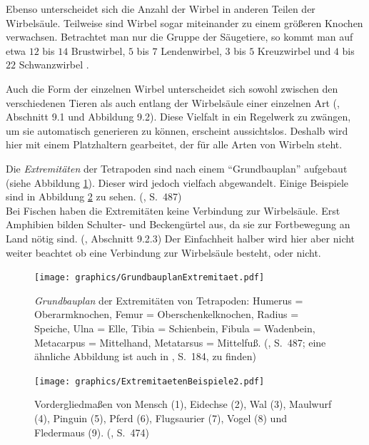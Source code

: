 Ebenso unterscheidet sich die Anzahl der Wirbel in anderen Teilen der Wirbelsäule. Teilweise sind Wirbel sogar miteinander zu einem größeren Knochen verwachsen. Betrachtet man nur die Gruppe der Säugetiere, so kommt man auf etwa $12$ bis $14$ Brustwirbel, $5$ bis $7$ Lendenwirbel, $3$ bis $5$ Kreuzwirbel und $4$ bis $22$ Schwanzwirbel \cite{AnatomieKuenstler}.

Auch die Form der einzelnen Wirbel unterscheidet sich sowohl zwischen den verschiedenen Tieren als auch entlang der Wirbelsäule einer einzelnen Art (\cite{Vergleichende_Anatomie}, Abschnitt 9.1 und Abbildung 9.2). Diese Vielfalt in ein Regelwerk zu zwängen, um sie automatisch generieren zu können, erscheint aussichtslos. Deshalb wird hier mit einem Platzhaltern gearbeitet, der für alle Arten von Wirbeln steht.

Die \emph{Extremitäten} der Tetrapoden sind nach einem "`Grundbauplan"' aufgebaut (siehe Abbildung \ref{grundbauplan}).  Dieser wird jedoch vielfach abgewandelt. Einige Beispiele sind in Abbildung \ref{bsp_extremitaeten} zu sehen. (\cite{AllgemeineZoologie}, S.\ 487)\\
Bei Fischen haben die Extremitäten keine Verbindung zur Wirbelsäule. Erst Amphibien bilden Schulter- und Beckengürtel aus, da sie zur Fortbewegung an Land nötig sind. (\cite{Vergleichende_Anatomie}, Abschnitt 9.2.3)
Der Einfachheit halber wird hier aber nicht weiter beachtet ob eine Verbindung zur Wirbelsäule besteht, oder nicht. 

\begin{figure}
 \centering
 \texttt{[image: graphics/GrundbauplanExtremitaet.pdf]}
 \caption{\emph{Grundbauplan} der Extremitäten von Tetrapoden: Humerus = Oberarmknochen, Femur = Oberschenkelknochen, Radius = Speiche, Ulna = Elle, Tibia = Schienbein, Fibula = Wadenbein, Metacarpus = Mittelhand, Metatarsus = Mittelfuß. (\cite{AllgemeineZoologie}, S.\ 487; eine ähnliche Abbildung ist auch in \cite{Vergleichende_Anatomie}, S.\ 184, zu finden)}
 \label{grundbauplan}
\end{figure}

\begin{figure}
 \centering
 \texttt{[image: graphics/ExtremitaetenBeispiele2.pdf]}
 \caption{Vordergliedmaßen von Mensch (1), Eidechse (2), Wal (3), Maulwurf (4), Pinguin (5), Pferd (6), Flugsaurier (7), Vogel (8) und Fledermaus (9). (\cite{dtvBiologie}, S.\ 474)}
 \label{bsp_extremitaeten}
\end{figure}

